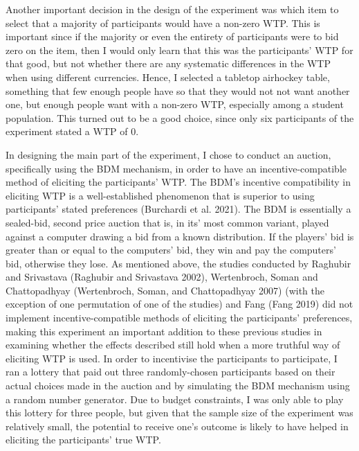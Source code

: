 \documentclass[
]{report}
\begin{document}
Another important decision in the design of the experiment was which
item to select that a majority of participants would have a non-zero
WTP. This is important since if the majority or even the entirety of
participants were to bid zero on the item, then I would only learn that
this was the participants' WTP for that good, but not whether there are
any systematic differences in the WTP when using different currencies.
Hence, I selected a tabletop airhockey table, something that few enough
people have so that they would not not want another one, but enough
people want with a non-zero WTP, especially among a student population.
This turned out to be a good choice, since only six participants of the
experiment stated a WTP of 0.

In designing the main part of the experiment, I chose to conduct an
auction, specifically using the BDM mechanism, in order to have an
incentive-compatible method of eliciting the participants' WTP. The
BDM's incentive compatibility in eliciting WTP is a well-established
phenomenon that is superior to using participants' stated preferences
(Burchardi et al. 2021). The BDM is essentially a sealed-bid, second
price auction that is, in its' most common variant, played against a
computer drawing a bid from a known distribution. If the players' bid is
greater than or equal to the computers' bid, they win and pay the
computers' bid, otherwise they lose. As mentioned above, the studies
conducted by Raghubir and Srivastava (Raghubir and Srivastava 2002),
Wertenbroch, Soman and Chattopadhyay (Wertenbroch, Soman, and
Chattopadhyay 2007) (with the exception of one permutation of one of the
studies) and Fang (Fang 2019) did not implement incentive-compatible
methods of eliciting the participants' preferences, making this
experiment an important addition to these previous studies in examining
whether the effects described still hold when a more truthful way of
eliciting WTP is used. In order to incentivise the participants to
participate, I ran a lottery that paid out three randomly-chosen
participants based on their actual choices made in the auction and by
simulating the BDM mechanism using a random number generator. Due to
budget constraints, I was only able to play this lottery for three
people, but given that the sample size of the experiment was relatively
small, the potential to receive one's outcome is likely to have helped
in eliciting the participants' true WTP.
\end{document}
